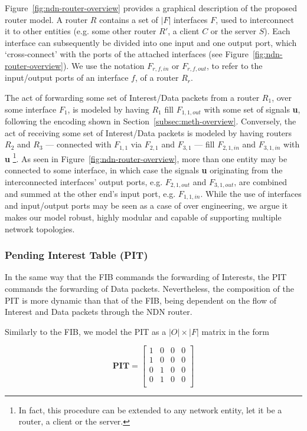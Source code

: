 Figure~\ref{fig:ndn-router-overview} provides a graphical description of the proposed 
router model. A router $R$ contains a set of $|F|$ interfaces $F$, used to interconnect 
it to other entities (e.g. some other router $R'$, a client $C$ or the server 
$S$). Each interface can subsequently be divided into one input and one output 
port, which `cross-connect' with the ports of the attached 
interfaces (see Figure~\ref{fig:ndn-router-overview}). We use the notation 
$F_{r,f,in}$ or $F_{r,f,out}$, to refer to the 
input\slash output ports of an interface $f$, of a router $R_r$.\shortvertbreak

The act of forwarding some set of Interest\slash Data packets from a router $R_1$, 
over some interface $F_1$, is modeled by having $R_1$ fill $F_{1,1,out}$ with 
some set of signals \textbf{u}, following the encoding shown in 
Section~\ref{subsec:meth-overview}. Conversely, the act of receiving some set 
of Interest\slash Data packets is modeled by having routers $R_2$ and $R_3$ --- 
connected with $F_{1,1}$ via $F_{2,1}$ and $F_{3,1}$ --- fill $F_{2,1,in}$ and $F_{3,1,in}$ 
with \textbf{u} \footnote{In fact, this procedure can be extended to any network entity, let 
it be a router, a client or the server.}. As seen in Figure~\ref{fig:ndn-router-overview}, 
more than one entity may be connected to some interface, in which case the 
signals \textbf{u} originating from the interconnected interfaces' output ports, 
e.g. $F_{2,1,out}$ and $F_{3,1,out}$, are combined and summed at the other 
end's input port, e.g. $F_{1,1,in}$. While the use of interfaces and 
input\slash output ports may be seen as a case of over engineering, we argue 
it makes our model robust, highly modular and capable of supporting multiple 
network topologies.\shortvertbreak

\subsubsection{Pending Interest Table (PIT)}
\label{subsec:meth-pit}

In the same way that the FIB commands the forwarding of Interests, the PIT 
commands the forwarding of Data packets. Nevertheless, the composition of the 
PIT is more dynamic than that of the FIB, being dependent on the flow of 
Interest and Data packets through the NDN router.\shortvertbreak

Similarly to the FIB, we model the PIT as a $|O| \times |F|$ matrix in the 
form

\begin{equation}
\textbf{PIT} = \begin{bmatrix} 1 & 0 & 0 & 0  \\ 
                1 & 0 & 0 & 0               \\ 
                0 & 1 & 0 & 0               \\ 
                0 & 1 & 0 & 0               \\ \end{bmatrix}
    \label{eq:pit}
\end{equation}\shortvertbreak

